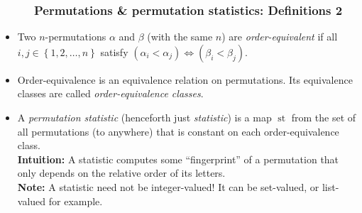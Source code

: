 \documentclass{beamer}
\newcommand{\st}{\operatorname{st}}
\newcommand{\fti}[1]{\frametitle{\ \ \ \ \ #1}}
\newcommand{\set}[1]{\left\{ #1 \right\}}
\newcommand{\tup}[1]{\left( #1 \right)}
\newcommand{\defn}[1]{{\color{darkred}\emph{#1}}} %
\theoremstyle{plain}
\begin{document}
\begin{frame}
\fti{Permutations \& permutation statistics: Definitions 2}

\begin{itemize}

\item Two $n$-permutations $\alpha$ and $\beta$ (with the same $n$)
      are \defn{order-equivalent} if all $i, j \in \set{1, 2, \ldots, n}$
      satisfy $\tup{\alpha_i < \alpha_j} \Longleftrightarrow
      \tup{\beta_i < \beta_j}$.

\item Order-equivalence is an equivalence relation on permutations.
      Its equivalence classes are called \defn{order-equivalence
      classes}.

\pause

\item A \defn{permutation statistic} (henceforth just \defn{statistic})
      is a map $\st$ from the set
      of all permutations (to anywhere) that is constant on each
      order-equivalence class. \\
      \textbf{Intuition:} A statistic computes some ``fingerprint''
      of a permutation that only depends on the relative order of its
      letters. \pause \\
      \textbf{Note:} A statistic need not be integer-valued!
      It can be set-valued, or list-valued for example.

\end{itemize}
\end{frame}
\end{document}
